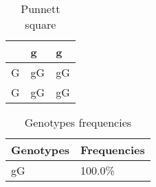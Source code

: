 \begin{table}[]
\centering
\caption{Punnett square}
\label{punnettsquare}
\begin{tabular}{l|ll}
\hline
& g & g \\ 
\hline
G & gG & gG \\ 
G & gG & gG 
\end{tabular}
\end{table}\begin{table}[]
\centering
\caption{Genotypes frequencies}
\label{genotypesfreq}
\begin{tabular}{ll}
\hline
Genotypes & Frequencies \\ \hline
gG & 100.0\% \\ \hline 

\end{tabular}
\end{table}